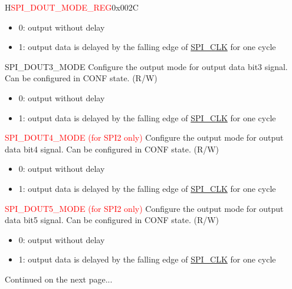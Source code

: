 \begin{register}{H}{\textcolor{red}{SPI\_DOUT\_MODE\_REG}}{0x{}002C}
\begin{regdesc}
\begin{reglist}
\begin{itemize}
    \item 0: output without delay
    \item 1: output data is delayed by the falling edge of \hyperref[clk:SPICLK]{SPI\_CLK} for one cycle
\end{itemize}

\label{fielddesc:SPIDOUT3MODE}\item [SPI\_DOUT3\_MODE] Configure the output mode for output data bit3 signal. Can be configured in CONF state. (R/W)

\begin{itemize}
    \item 0: output without delay
    \item 1: output data is delayed by the falling edge of \hyperref[clk:SPICLK]{SPI\_CLK} for one cycle
\end{itemize}

\label{fielddesc:SPIDOUT4MODE}\item [\textcolor{red}{SPI\_DOUT4\_MODE (for SPI2 only)}] Configure the output mode for output data bit4 signal. Can be configured in CONF state. (R/W)

\begin{itemize}
    \item 0: output without delay
    \item 1: output data is delayed by the falling edge of \hyperref[clk:SPICLK]{SPI\_CLK} for one cycle
\end{itemize}

\label{fielddesc:SPIDOUT5MODE}\item [\textcolor{red}{SPI\_DOUT5\_MODE  (for SPI2 only)}] Configure the output mode for output data bit5 signal. Can be configured in CONF state. (R/W)

\begin{itemize}
    \item 0: output without delay
    \item 1: output data is delayed by the falling edge of \hyperref[clk:SPICLK]{SPI\_CLK} for one cycle
\end{itemize}

\item [Continued on the next page...]
\end{reglist}\end{regdesc}
\end{register}

